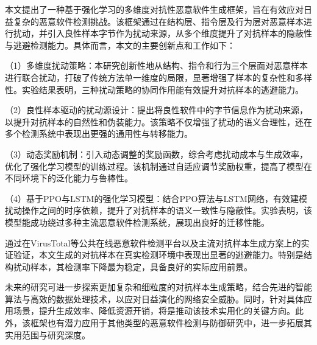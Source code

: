 %
%
%
%

\begin{conclusion}

本文提出了一种基于强化学习的多维度对抗性恶意软件生成框架，旨在有效应对日益复杂的恶意软件检测挑战。该框架通过在结构层、指令层及行为层对恶意样本进行扰动，并引入良性样本字节作为扰动来源，从多个维度提升了对抗样本的隐蔽性与逃避检测能力。具体而言，本文的主要创新点和工作如下：

（1）多维度扰动策略：本研究创新性地从结构、指令和行为三个层面对恶意样本进行联合扰动，打破了传统方法单一维度的局限，显著增强了样本的复杂性和多样性。实验结果表明，三种扰动策略的协同作用能有效提升对抗样本的逃避能力。

（2）良性样本驱动的扰动源设计：提出将良性软件中的字节信息作为扰动来源，以提升对抗样本的自然性和伪装能力。该策略不仅增强了扰动的语义合理性，还在多个检测系统中表现出更强的通用性与转移能力。
	
（3）动态奖励机制：引入动态调整的奖励函数，综合考虑扰动成本与生成效率，优化了强化学习模型的训练过程。该机制通过自适应调节奖励权重，提高了模型在不同环境下的泛化能力与鲁棒性。
	
（4）基于PPO与LSTM的强化学习模型：结合PPO算法与LSTM网络，有效建模扰动操作之间的时序依赖，提升了对抗样本的语义一致性与隐蔽性。实验表明，该模型能成功绕过多种主流恶意软件检测系统，展现出良好的迁移性能。
	
通过在VirusTotal等公共在线恶意软件检测平台以及主流对抗样本生成方案上的实证验证，本文生成的对抗样本在真实检测环境中表现出显著的逃避能力。特别是结构扰动样本，其检测率下降最为稳定，具备良好的实际应用前景。
	
未来的研究可进一步探索更加复杂和细粒度的对抗样本生成策略，结合先进的智能算法与高效的数据处理技术，以应对日益演化的网络安全威胁。同时，针对具体应用场景，提升生成效率、降低资源开销，将是推动该技术实用化的关键方向。此外，该框架也有潜力应用于其他类型的恶意软件检测与防御研究中，进一步拓展其实用范围与研究深度。

\end{conclusion}
